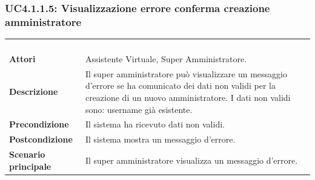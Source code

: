 \subsubsection{UC4.1.1.5: Visualizzazione errore conferma creazione amministratore}
\label{UC4.1.1.5}
\begin{longtable}{l|p{10cm}}
\rowcolor[gray]{0.8} \multicolumn{2}{c}{} \\
\rowcolor[gray]{0.8} \multicolumn{2}{c}{\textbf{UC4.1.1.5 - Visualizzazione errore conferma creazione amministratore}} \\
\rowcolor[gray]{0.8} \multicolumn{2}{c}{} \\
\hline
&\\
\textbf{Attori} & Assistente Virtuale, Super Amministratore.\\[7pt]
\textbf{Descrizione} & Il super amministratore può visualizzare un messaggio d'errore se ha comunicato dei dati non validi per la creazione di un nuovo amministratore.
I dati non validi sono: username già esistente.\\[7pt]
\textbf{Precondizione} & Il sistema ha ricevuto dati non validi.\\[7pt]
\textbf{Postcondizione} & Il sistema mostra un messaggio d'errore.\\[7pt]
\textbf{Scenario principale} &Il super amministratore visualizza un messaggio d'errore.\\[7pt]\hline
\end{longtable}


